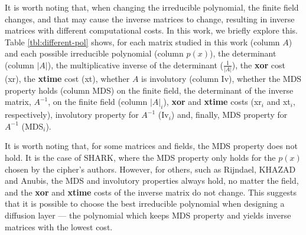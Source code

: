 It is worth noting that, when changing the irreducible polynomial, the finite field changes, and that may cause the inverse matrices to change, resulting in inverse matrices with different computational costs. In this work, we briefly explore this. Table \ref{tbl:different-pol} shows, for each matrix studied in this work (column $A$) and each possible irreducible polynomial (column $p(x)$), the determinant (column $|A|$), the multiplicative inverse of the determinant ($\frac{1}{|A|}$), the \textbf{xor} cost (xr), the \textbf{xtime} cost (xt), whether $A$ is involutory (column Iv), whether the MDS property holds (column MDS) on the finite field, the determinant of the inverse matrix, $A^{-1}$, on the finite field (column $|A|_i$), \textbf{xor} and \textbf{xtime} costs (xr$_i$ and xt$_i$, respectively), involutory property for $A^{-1}$ (Iv$_i$) and, finally, MDS property for $A^{-1}$ (MDS$_i$).

It is worth noting that, for some matrices and fields, the MDS property does not hold. It is the case of SHARK, where the MDS property only holds for the $p(x)
$ chosen by the cipher's authors. However, for others, such as Rijndael, KHAZAD and Anubis, the MDS and involutory properties always hold, no matter the field, and the \textbf{xor} and \textbf{xtime} costs of the inverse matrix do not change. This suggests that it is possible to choose the best irreducible polynomial when designing a diffusion layer --- the polynomial which keeps MDS property and yields inverse matrices with the lowest cost.

